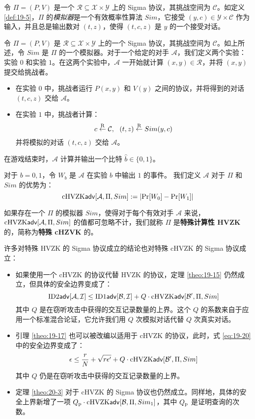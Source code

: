 令 $\Pi=(P,V)$ 是一个 $\mathcal{R}\subseteq\mathcal{X}\times\mathcal{Y}$ 上的 Sigma 协议，其挑战空间为 $\mathcal C$。如定义 \ref{def:19-5}，$\Pi$ 的\emph{模拟器}是一个有效概率性算法 $Sim$，它接受 $(y,c)\in\mathcal{Y}\times\mathcal{C}$ 作为输入，并且总是输出数对 $(t,z)$，使得 $(t,c,z)$ 是 $y$ 的一个接受对话。

\begin{game}[特殊 cHVZK]\label{game:20-4}
令 $\Pi=(P,V)$ 是 $\mathcal{R}\subseteq\mathcal{X}\times\mathcal{Y}$ 上的一个 Sigma 协议，其挑战空间为 $\mathcal C$。如上所述，令 $Sim$ 是 $\Pi$ 的一个模拟器。对于一个给定的对手 $\mathcal A$，我们定义两个实验：实验 $0$ 和实验 $1$。在这两个实验中，$\mathcal A$ 一开始就计算 $(x,y)\in\mathcal{R}$，并将 $(x,y)$ 提交给挑战者。
\begin{itemize}
	\item 在实验 $0$ 中，挑战者运行 $P(x,y)$ 和 $V(y)$ 之间的协议，并将得到的对话 $(t,c,z)$ 交给 $\mathcal A$。
	\item 在实验 $1$ 中，挑战者计算：
	$$
    c\overset{\rm R}\leftarrow\mathcal C,~~
    (t,z)\overset{\rm R}\leftarrow Sim(y,c)
    $$
    并将模拟的对话 $(t,c,z)$ 交给 $\mathcal A$。
\end{itemize}
在游戏结束时，$\mathcal A$ 计算并输出一个比特 $\hat b\in\{0,1\}$。

对于 $b=0,1$，令 $W_b$ 是 $\mathcal A$ 在实验 $b$ 中输出 $1$ 的事件。 我们定义 $\mathcal A$ 对于 $\Pi$ 和 $Sim$ 的优势为：
$$
{\rm cHVZK\mathsf{adv}}[\mathcal{A},\Pi,Sim]:=\left|\Pr[W_0]-\Pr[W_1]\right|
$$
\end{game}

\begin{definition}
如果存在一个 $\Pi$ 的模拟器 $Sim$，使得对于每个有效对手 $\mathcal A$ 来说，${\rm cHVZK\mathsf{adv}}[\mathcal{A},\Pi,Sim]$ 的值都可忽略不计，我们就称 $\Pi$ 是\textbf{特殊计算性 HVZK} 的，简称为\textbf{特殊 cHZVK} 的。
\end{definition}

许多对特殊 HVZK 的 Sigma 协议成立的结论也对特殊 cHVZK 的 Sigma 协议成立：
\begin{itemize}
	\item 如果使用一个 cHVZK 的协议代替 HVZK 的协议，定理 \ref{theo:19-15} 仍然成立，但具体的安全边界变成了：
	$$
    {\rm ID2\mathsf{adv}}[\mathcal A,\mathcal I]\leq{\rm ID1\mathsf{adv}}[\mathcal B,\mathcal I]+Q\cdot{\rm cHVZK\mathsf{adv}}[\mathcal{B}',\Pi,Sim]
    $$
    其中 $Q$ 是在窃听攻击中获得的交互记录数量的上界。这个 $Q$ 的系数来自于应用一个标准混合论证，它允许我们用 $Q$ 次模拟对话代替 $Q$ 次真实对话。
    \item 引理 \ref{theo:19-17} 也可以被改编以适用于 cHVZK 的协议，此时，式 \ref{eq:19-20} 中的安全边界变成了：
    $$
    \epsilon\leq\frac{r}{N}+\sqrt{r\epsilon'}+Q\cdot{\rm cHVZK\mathsf{adv}}[\mathcal{B}',\Pi,Sim]
    $$
    其中 $Q$ 仍是在窃听攻击中获得的交互记录数量的上界。
    \item 定理 \ref{theo:20-3} 对于 cHVZK 的 Sigma 协议也仍然成立。同样地，具体的安全上界新增了一项 $Q_{\rm p}\cdot{\rm cHVZK\mathsf{adv}}[\mathcal{B},\Pi,Sim_1]$，其中 $Q_{\rm p}$ 是证明查询的次数。
\end{itemize}


